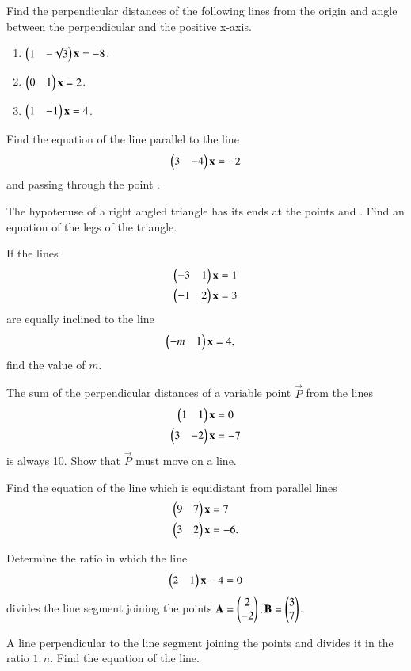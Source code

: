 \item Find the perpendicular distances of the following lines from the origin and angle between the perpendicular and the positive x-axis.
\begin{enumerate}
\item $\begin{pmatrix}1 & -\sqrt{3}\end{pmatrix}\mathbf{x} = -8$.
\item $\begin{pmatrix}0 & 1\end{pmatrix}\mathbf{x} = 2$.
\item $\begin{pmatrix}1 & -1\end{pmatrix}\mathbf{x} = 4$.
\end{enumerate}

\item Find the equation of the line parallel to the line 
\begin{align}
\begin{pmatrix}3 & -4\end{pmatrix}\mathbf{x} = -2
\end{align}
%
and passing through the point .
%
\item The hypotenuse of a right angled triangle has its ends at the points  and . Find an equation of the legs of the triangle.

\item If the lines
%
%
\begin{align}
\begin{pmatrix}-3 & 1\end{pmatrix}\mathbf{x} &= 1
\\
\begin{pmatrix}-1 & 2\end{pmatrix}\mathbf{x} &= 3
\end{align}
%
are equally inclined to the line
%
\begin{align}
\begin{pmatrix}-m & 1\end{pmatrix}\mathbf{x} &= 4,
\end{align}
%
find the value of $m$.
%
\item The sum of the perpendicular distances of a variable point $\vec{P}$ from the lines
%
\begin{align}
\begin{pmatrix}1 & 1\end{pmatrix}\mathbf{x} &= 0
\\
\begin{pmatrix}3 & -2\end{pmatrix}\mathbf{x} &= -7
\end{align}
%
is always 10.  Show that $\vec{P}$ must move on a line.
%
\item Find the equation of the line which is equidistant from parallel lines
%
\begin{align}
\begin{pmatrix}9 & 7\end{pmatrix}\mathbf{x} &= 7
\\
\begin{pmatrix}3 & 2\end{pmatrix}\mathbf{x} &= -6.
\end{align}
%
\solution

\item Determine the ratio in which the line 
\begin{align}
\begin{pmatrix}2 & 1\end{pmatrix}\mathbf{x} - 4 = 0
\end{align}
%
divides the line segment joining the points $\mathbf{A}=\begin{pmatrix}2\\-2\end{pmatrix}, \mathbf{B}=\begin{pmatrix}3\\7\end{pmatrix}$.
\item A line perpendicular to the line segment joining the points  and  divides it in the ratio $1:n$.  Find the equation of the line.
\\
\solution


